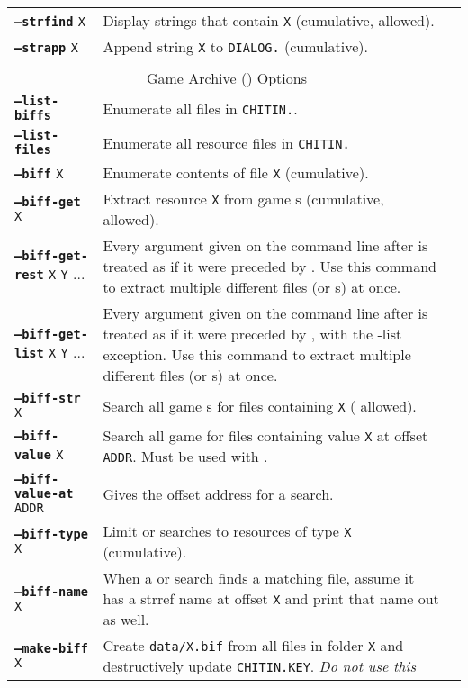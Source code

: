 \documentclass{article}
\def\ttref#1{\ahrefloc{#1}{\tt #1}}
\def\DEFINE#1{{\tt \bf #1}\label{#1}\index{#1}}
\def\t#1{{\tt #1}}
\begin{document}
\begin{tabular}{lp{10in}|p{10in}}
\DEFINE{--strfind} \t{X}&	Display strings that contain {\tt X} (cumulative, \ttref{regexp} allowed). \\
\DEFINE{--strapp} \t{X}&	Append string \t{X} to \t{DIALOG.}\ttref{TLK} (cumulative). \\
\\
\multicolumn{2}{c}{ \color{red} Game Archive (\ttref{BIFF}) Options} \\
\DEFINE{--list-biffs}&	Enumerate all \ttref{BIFF} files in \t{CHITIN.}\ttref{KEY}. \\
\DEFINE{--list-files}&	Enumerate all resource files in \t{CHITIN.}\ttref{KEY} \\
\DEFINE{--biff} \t{X} & Enumerate contents of \ttref{BIFF} file \t{X} (cumulative). \\
\DEFINE{--biff-get} \t{X}&	Extract resource \t{X} from game \ttref{BIFF}s (cumulative, \ttref{regexp} allowed). \\
\DEFINE{--biff-get-rest} \t{X} \t{Y} ... & Every argument given on the
command line after \ttref{--biff-get-rest} is treated as if it were
preceded by \ttref{--biff-get}. Use this command to extract multiple
different files (or \ttref{regexp}s) at once. \\
\DEFINE{--biff-get-list} \t{X} \t{Y} ... & Every argument given on the
command line after \ttref{--biff-get-rest} is treated as if it were
preceded by \ttref{--biff-get}, with the -list exception. Use this command to extract multiple
different files (or \ttref{regexp}s) at once. \\
\DEFINE{--biff-str} \t{X}&	Search all game \ttref{BIFF}s for files
containing \t{X} (\ttref{regexp} allowed). \\
\DEFINE{--biff-value} \t{X} &   Search all game \ttref{BIFFs} for files
containing value \t{X} at offset \t{ADDR}. Must be used with
\ttref{--biff-value-at}. \\
\DEFINE{--biff-value-at} \t{ADDR} & Gives the offset address for a
\ttref{--biff-value} search. \\
\DEFINE{--biff-type} \t{X}&	Limit \ttref{--biff-str} or
\ttref{--biff-value} searches to
resources of type \t{X} (cumulative). \\
\DEFINE{--biff-name} \t{X}&	When a \ttref{--biff-str} or
\ttref{--biff-value} search finds a
matching file, assume it has a strref name at offset \t{X} and print that
name out as well. \\
\DEFINE{--make-biff} \t{X} & Create \t{data/X.bif} from all files in
folder \t{X} and destructively update \t{CHITIN.KEY}. \emph{Do not use this
}
\end{tabular}
\end{document}

